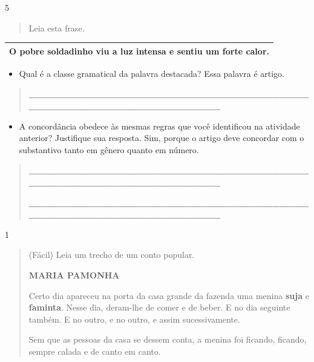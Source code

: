 \begin{itemize}
{{{\begin{itemize}
\begin{itemize}
\begin{itemize}
\num{5}

\begin{quote}
Leia esta frase.
\end{quote}

\begin{longtable}[]{@{}l@{}}
\toprule
O pobre soldadinho viu a luz intensa e sentiu um forte
calor.\tabularnewline
\bottomrule
\end{longtable}

\begin{itemize}
\item
  Qual é a classe gramatical da palavra destacada? Essa palavra é
  artigo.
\end{itemize}

\begin{quote}
\textbf{\_\_\_\_\_\_\_\_\_\_\_\_\_\_\_\_\_\_\_\_\_\_\_\_\_\_\_\_\_\_\_\_\_\_\_\_\_\_\_\_\_\_\_\_\_\_\_\_\_\_\_\_\_\_\_\_\_\_\_\_\_\_\_\_}
\end{quote}

\begin{itemize}
\item
  A concordância obedece às mesmas regras que você identificou na
  atividade anterior? Justifique sua resposta. Sim, porque o artigo deve
  concordar com o substantivo tanto em gênero quanto em número.
\end{itemize}

\begin{quote}
\textbf{\_\_\_\_\_\_\_\_\_\_\_\_\_\_\_\_\_\_\_\_\_\_\_\_\_\_\_\_\_\_\_\_\_\_\_\_\_\_\_\_\_\_\_\_\_\_\_\_\_\_\_\_\_\_\_\_\_\_\_\_\_\_\_\_}

\textbf{\_\_\_\_\_\_\_\_\_\_\_\_\_\_\_\_\_\_\_\_\_\_\_\_\_\_\_\_\_\_\_\_\_\_\_\_\_\_\_\_\_\_\_\_\_\_\_\_\_\_\_\_\_\_\_\_\_\_\_\_\_\_\_\_}
\end{quote}


\num{1}

\begin{quote}
(Fácil) Leia um trecho de um conto popular.

\textbf{MARIA PAMONHA}

Certo dia apareceu na porta da casa grande da fazenda uma menina
\textbf{suja} e \textbf{faminta}. Nesse dia, deram-lhe de comer e de
beber. E no dia seguinte também. E no outro, e no outro, e assim
sucessivamente.

Sem que as pessoas da casa se dessem conta, a menina foi ficando,
ficando, sempre calada e de canto em canto.


\end{quote}
\end{itemize}
\end{itemize}
\end{itemize}}}}
\end{itemize}
